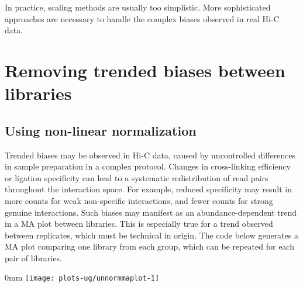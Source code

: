 \documentclass{report}\usepackage[]{graphicx}\usepackage[usenames,dvipsnames]{color}
\makeatletter
\def\maxwidth{ %
  \ifdim\Gin@nat@width>\linewidth
    \linewidth
  \else
    \Gin@nat@width
  \fi
}
\newcommand{\hlnum}[1]{\textcolor[rgb]{0.816,0.125,0.439}{#1}}%
\newcommand{\hlstr}[1]{\textcolor[rgb]{0.251,0.627,0.251}{#1}}%
\newcommand{\hlopt}[1]{\textcolor[rgb]{0,0,0}{#1}}%
\newcommand{\hlstd}[1]{\textcolor[rgb]{0.251,0.251,0.251}{#1}}%
\newcommand{\hlkwb}[1]{\textcolor[rgb]{0,0,0}{#1}}%
\newcommand{\hlkwc}[1]{\textcolor[rgb]{0.251,0.251,0.251}{#1}}%
\newcommand{\hlkwd}[1]{\textcolor[rgb]{0.878,0.439,0.125}{#1}}%
\newenvironment{knitrout}{}{} %
\makeatother
\begin{document}
In practice, scaling methods are usually too simplistic.
More sophisticated approaches are necessary to handle the complex biases observed in real Hi-C data.

\section{Removing trended biases between libraries}

\subsection{Using non-linear normalization}
Trended biases may be observed in Hi-C data, caused by uncontrolled differences in sample preparation in a complex protocol.
Changes in cross-linking efficiency or ligation specificity can lead to a systematic redistribution of read pairs throughout the interaction space. 
For example, reduced specificity may result in more counts for weak non-specific interactions, and fewer counts for strong genuine interactions.
Such biases may manifest as an abundance-dependent trend in a MA plot between libraries.
This is especially true for a trend observed between replicates, which must be technical in origin.
The code below generates a MA plot comparing one library from each group, which can be repeated for each pair of libraries.





\begin{knitrout}
\color{fgcolor}\begin{adjustwidth}{\fltoffset}{0mm}
\texttt{[image: plots-ug/unnormmaplot-1]} \end{adjustwidth}
\end{knitrout}
\end{document}
